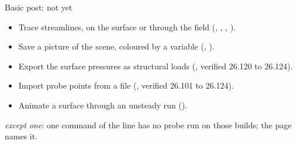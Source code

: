 \begin{frame}{Basic post: not yet}
\begin{itemize}\small
  \item Trace streamlines, on the surface or through the field (, , , ).
  \item Save a picture of the scene, coloured by a variable (, ).
  \item Export the surface pressures as structural loads (, verified 26.120 to 26.124).
  \item Import probe points from a file (, verified 26.101 to 26.124).
  \item Animate a surface through an unsteady run ().
\end{itemize}
{\scriptsize \emph{except one}: one command of the line has no probe run on those builds; the page names it.\par}
\end{frame}
